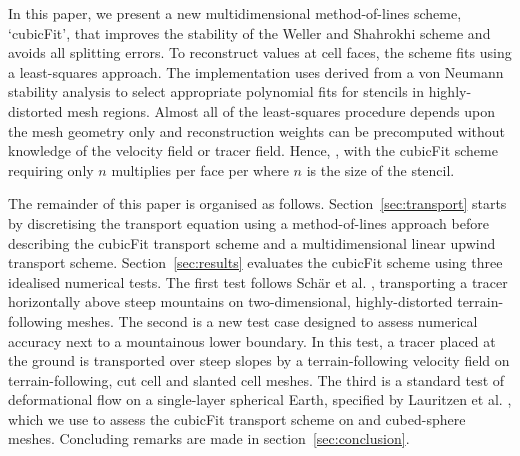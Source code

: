 In this paper, we present a new multidimensional method-of-lines scheme, `cubicFit', that improves the stability of the Weller and Shahrokhi scheme \citep{weller-shahrokhi2014} and avoids all splitting errors.  To reconstruct values at cell faces, the scheme fits  using a least-squares approach.  The implementation uses  derived from a von Neumann stability analysis to select appropriate polynomial fits for stencils in highly-distorted mesh regions.  Almost all of the least-squares procedure depends upon the mesh geometry only and reconstruction weights can be precomputed without knowledge of the velocity field or tracer field.
Hence, , with the cubicFit scheme requiring only $n$ multiplies per face per  where $n$ is the size of the stencil.  

The remainder of this paper is organised as follows.
Section~\ref{sec:transport} starts by discretising the transport equation using a method-of-lines approach before describing the cubicFit transport scheme and a multidimensional linear upwind transport scheme.
Section~\ref{sec:results} evaluates the cubicFit scheme using three idealised numerical tests.
The first test follows Sch\"ar et al. \citep{schaer2002}, transporting a tracer horizontally above steep mountains on two-dimensional, highly-distorted terrain-following meshes.
The second is a new test case designed to assess numerical accuracy next to a mountainous lower boundary.  In this test, a tracer placed at the ground is transported over steep slopes by a terrain-following velocity field on terrain-following, cut cell and slanted cell meshes.
The third is a standard test of deformational flow on a single-layer spherical Earth, specified by Lauritzen et al. \citep{lauritzen2012}, which we use to assess the cubicFit transport scheme on  and cubed-sphere meshes.
Concluding remarks are made in section~\ref{sec:conclusion}.

